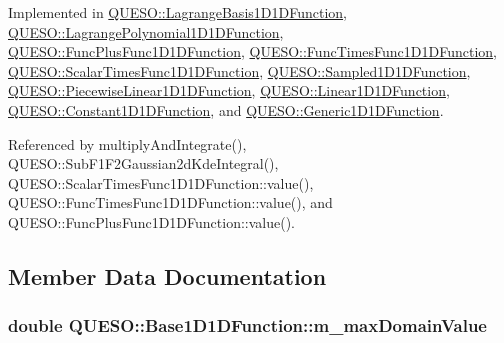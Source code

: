 Implemented in \hyperlink{class_q_u_e_s_o_1_1_lagrange_basis1_d1_d_function_ae41dda050ae3e18f057a44fb2d64b6d2}{Q\-U\-E\-S\-O\-::\-Lagrange\-Basis1\-D1\-D\-Function}, \hyperlink{class_q_u_e_s_o_1_1_lagrange_polynomial1_d1_d_function_ada2741739cc9ff0fe98bb51e690df072}{Q\-U\-E\-S\-O\-::\-Lagrange\-Polynomial1\-D1\-D\-Function}, \hyperlink{class_q_u_e_s_o_1_1_func_plus_func1_d1_d_function_a9e7a69d195d586fa982c6088ff6a7007}{Q\-U\-E\-S\-O\-::\-Func\-Plus\-Func1\-D1\-D\-Function}, \hyperlink{class_q_u_e_s_o_1_1_func_times_func1_d1_d_function_adebec22c4730abfe9d5000785a77d000}{Q\-U\-E\-S\-O\-::\-Func\-Times\-Func1\-D1\-D\-Function}, \hyperlink{class_q_u_e_s_o_1_1_scalar_times_func1_d1_d_function_af3ff65dedf376a0acde1df1f70fdfd51}{Q\-U\-E\-S\-O\-::\-Scalar\-Times\-Func1\-D1\-D\-Function}, \hyperlink{class_q_u_e_s_o_1_1_sampled1_d1_d_function_a779a96683625c9bf6a161cf98ab63f9b}{Q\-U\-E\-S\-O\-::\-Sampled1\-D1\-D\-Function}, \hyperlink{class_q_u_e_s_o_1_1_piecewise_linear1_d1_d_function_a977ad3478bf488b1e3d472f31c3fe146}{Q\-U\-E\-S\-O\-::\-Piecewise\-Linear1\-D1\-D\-Function}, \hyperlink{class_q_u_e_s_o_1_1_linear1_d1_d_function_a4264993c026b0a55af32131027c923ff}{Q\-U\-E\-S\-O\-::\-Linear1\-D1\-D\-Function}, \hyperlink{class_q_u_e_s_o_1_1_constant1_d1_d_function_aa80d085d1b5744396df97ec74055cf1f}{Q\-U\-E\-S\-O\-::\-Constant1\-D1\-D\-Function}, and \hyperlink{class_q_u_e_s_o_1_1_generic1_d1_d_function_a4ed092b36144d91ac573e871062cca16}{Q\-U\-E\-S\-O\-::\-Generic1\-D1\-D\-Function}.



Referenced by multiply\-And\-Integrate(), Q\-U\-E\-S\-O\-::\-Sub\-F1\-F2\-Gaussian2d\-Kde\-Integral(), Q\-U\-E\-S\-O\-::\-Scalar\-Times\-Func1\-D1\-D\-Function\-::value(), Q\-U\-E\-S\-O\-::\-Func\-Times\-Func1\-D1\-D\-Function\-::value(), and Q\-U\-E\-S\-O\-::\-Func\-Plus\-Func1\-D1\-D\-Function\-::value().



\subsection{Member Data Documentation}
\hypertarget{class_q_u_e_s_o_1_1_base1_d1_d_function_aa0025999ccab2145cd46c0a81e260e8f}{
\subsubsection[{m\-\_\-max\-Domain\-Value}]{\setlength{\rightskip}{0pt plus 5cm}double Q\-U\-E\-S\-O\-::\-Base1\-D1\-D\-Function\-::m\-\_\-max\-Domain\-Value\hspace{0.3cm}{\ttfamily [protected]}}}\label{class_q_u_e_s_o_1_1_base1_d1_d_function_aa0025999ccab2145cd46c0a81e260e8f}


